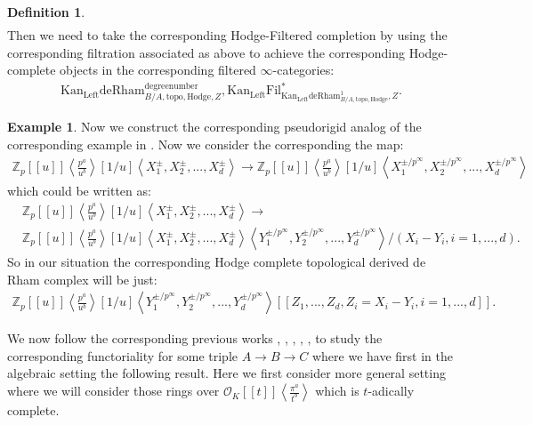 \documentclass[11pt]{book}
\theoremstyle{definition}
\newtheorem{definition}[theorem]{Definition}
\numberwithin{equation}{section}
\newtheorem{example}[theorem]{Example}
\begin{document}
\begin{definition}
\begin{align}
\end{align}
Then we need to take the corresponding Hodge-Filtered completion by using the corresponding filtration associated as above to achieve the corresponding Hodge-complete objects in the corresponding filtered $\infty$-categories:
\begin{align}
\mathrm{Kan}_\mathrm{Left}{\mathrm{deRham}}^\text{degreenumber}_{B/A,\mathrm{topo,Hodge},Z},\mathrm{Kan}_\mathrm{Left}\mathrm{Fil}^*_{\mathrm{Kan}_\mathrm{Left}{\mathrm{deRham}}^1_{B/A,\mathrm{topo,Hodge}},Z}.	
\end{align} 	
\end{definition}




\begin{example}
Now we construct the corresponding pseudorigid analog of the corresponding example in \cite[Example 4.7]{12GL}. Now we consider the corresponding the map:
\begin{align}
\mathbb{Z}_p[[u]]\left<\frac{p^a}{u^b}\right>[1/u]\left<X^\pm_1,X^\pm_2,...,X^\pm_d\right>\longrightarrow \mathbb{Z}_p[[u]]\left<\frac{p^a}{u^b}\right>[1/u]\left<X^{\pm/p^\infty}_1,X^{\pm/p^\infty}_2,...,X^{\pm/p^\infty}_d\right>	
\end{align}
which could be written as:	
\begin{align}
&\mathbb{Z}_p[[u]]\left<\frac{p^a}{u^b}\right>[1/u]\left<X^\pm_1,X^\pm_2,...,X^\pm_d\right>\longrightarrow \\
&\mathbb{Z}_p[[u]]\left<\frac{p^a}{u^b}\right>[1/u]\left<X^\pm_1,X^\pm_2,...,X^\pm_d\right>\left<Y^{\pm/p^\infty}_1,Y^{\pm/p^\infty}_2,...,Y^{\pm/p^\infty}_d\right>/(X_i-Y_i,i=1,...,d).	
\end{align}
So in our situation the corresponding Hodge complete topological derived de Rham complex will be just:
\begin{align}
\mathbb{Z}_p[[u]]\left<\frac{p^a}{u^b}\right>[1/u]\left<Y^{\pm/p^\infty}_1,Y^{\pm/p^\infty}_2,...,Y^{\pm/p^\infty}_d\right>[[Z_1,...,Z_d,Z_i=X_i-Y_i,i=1,...,d]].	
\end{align}

\end{example}




\indent We now follow the corresponding previous works \cite[Chapter 2, Chapter 8]{12B1}, \cite[Chapter 1]{12Bei}, \cite[Chapter 5]{12G1}, \cite[Chapter 3, Chapter 4]{12GL}, \cite{12Ill1}, \cite[Chapitre VIII]{12Ill2} to study the corresponding functoriality for some triple $A\rightarrow B \rightarrow C$ where we have first in the algebraic setting the following result. Here we first consider more general setting where we will consider those rings over $\mathcal{O}_K[[t]]\left<\frac{\pi^a}{t^b}\right>$ which is $t$-adically complete.
\end{document}
